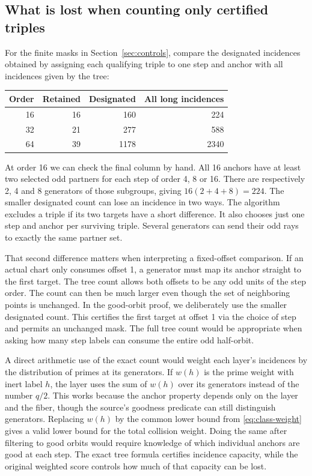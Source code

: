 \documentclass[12pt,letterpaper]{article}
\begin{document}
\subsection{What is lost when counting only certified triples}

For the finite masks in Section~\ref{sec:controls}, compare the designated incidences obtained by assigning each qualifying triple to one step and anchor with all incidences given by the tree:
\begin{center}
\begin{tabular}{@{}rrrr@{}}
\toprule
Order & Retained & Designated & All long incidences\\
\midrule
16&16&160&224\\
32&21&277&588\\
64&39&1178&2340\\
\bottomrule
\end{tabular}
\end{center}
At order 16 we can check the final column by hand. All 16 anchors have at least two selected odd partners for each step of order 4, 8 or 16. There are respectively 2, 4 and 8 generators of those subgroups, giving \(16(2+4+8)=224\). The smaller designated count can lose an incidence in two ways. The algorithm excludes a triple if its two targets have a short difference. It also chooses just one step and anchor per surviving triple. Several generators can send their odd rays to exactly the same partner set.

That second difference matters when interpreting a fixed-offset comparison. If an actual chart only consumes offset 1, a generator must map its anchor straight to the first target. The tree count allows both offsets to be any odd units of the step order. The count can then be much larger even though the set of neighboring points is unchanged. In the good-orbit proof, we deliberately use the smaller designated count. This certifies the first target at offset 1 via the choice of step and permits an unchanged mask. The full tree count would be appropriate when asking how many step labels can consume the entire odd half-orbit.

A direct arithmetic use of the exact count would weight each layer's incidences by the distribution of primes at its generators. If \(w(h)\) is the prime weight with inert label \(h\), the layer uses the sum of \(w(h)\) over its generators instead of the number \(q/2\). This works because the anchor property depends only on the layer and the fiber, though the source's goodness predicate can still distinguish generators. Replacing \(w(h)\) by the common lower bound from \eqref{eq:class-weight} gives a valid lower bound for the total collision weight. Doing the same after filtering to good orbits would require knowledge of which individual anchors are good at each step. The exact tree formula certifies incidence capacity, while the original weighted score controls how much of that capacity can be lost.
\end{document}
